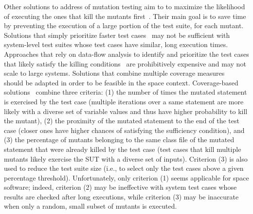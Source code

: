Other solutions to address  of mutation testing  aim to  to maximize the likelihood of executing the ones that kill the mutants first~\cite{just2012using,papadakis2011automatically,zhang2013faster}. Their main goal is to save time by preventing the execution of a large portion of the test suite, for each mutant.
Solutions that simply prioritize faster test cases~\cite{just2012using}
 may not be sufficient with system-level test suites whose test cases have similar, long execution times.
Approaches that rely on data-flow analysis to identify and prioritize the test cases that likely satisfy the killing conditions~\cite{papadakis2011automatically} are prohibitively expensive and may not scale to large systems.
Solutions that combine multiple coverage measures~\cite{zhang2013faster} should be adapted in order
to be feasible in the space context.
Coverage-based solutions~\cite{zhang2013faster} combine three criteria: (1) the number of times the mutated statement is exercised by the test case (multiple iterations over a same statement are more likely with a diverse set of variable values and thus have higher probability to kill the mutant), (2) the proximity of the mutated statement to the end of the test case (closer ones have higher chances of satisfying the sufficiency condition), and (3) the percentage of mutants belonging to the same class file of the mutated statement that were already killed by the test case (test cases that kill multiple mutants likely exercise the SUT with a diverse set of inputs).
Criterion (3) is also used to reduce the test suite size (i.e., to select only the test cases above a given percentage threshold).
Unfortunately, only criterion (1) seems applicable for space software; indeed, criterion (2) may be ineffective with system test cases whose results are checked after long executions, while criterion (3) may be inaccurate when only a random, small subset of mutants is executed.






%
%
%




